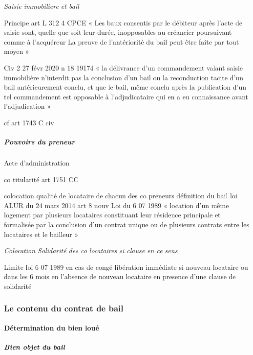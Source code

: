 \documentclass[10pt,a4paper,twoside]{article}
\newenvironment*{focus}[1][]{\medskip \textbf{#1} \newline \itshape}{}
\begin{document}
					\begin{focus}{Saisie immobiliere et bail}

						Principe art L 312 4 CPCE « Les baux consentis par le débiteur
						après l'acte de saisie sont, quelle que soit leur durée,
						inopposables au créancier poursuivant comme à l'acquéreur La
						preuve de l'antériorité du bail peut être faite par tout moyen »

						Civ 2 27 févr 2020 n 18 19174 « la délivrance d'un
						commandement valant saisie immobilière n'interdit pas la
						conclusion d'un bail ou la reconduction tacite d'un bail
						antérieurement conclu, et que le bail, même conclu après la
						publication d'un tel commandement est opposable à
						l'adjudicataire qui en a eu connaissance avant l'adjudication »

						cf art 1743 C civ

					\end{focus}

				\subparagraph{Pouvoirs du preneur}

					Acte d’administration

					co titularité art 1751 CC

					colocation qualité de locataire de chacun des co
					preneurs définition du bail loi ALUR du 24 mars 2014
					art 8 nouv Loi du 6 07 1989 « location d'un même
					logement par plusieurs locataires constituant leur
					résidence principale et formalisée par la conclusion d'un
					contrat unique ou de plusieurs contrats entre les
					locataires et le bailleur »

					\begin{focus}{Colocation}
						Solidarité des co locataires si clause en ce sens

						Limite loi 6 07 1989 en cas de congé libération immédiate si nouveau locataire ou dans les 6 mois en l’absence de nouveau locataire en presence d’une clause de solidarité
					\end{focus}

		\subsubsection{Le contenu du contrat de bail}

			\paragraph{Détermination du bien loué}

				\subparagraph{Bien objet du bail}
\end{document}

